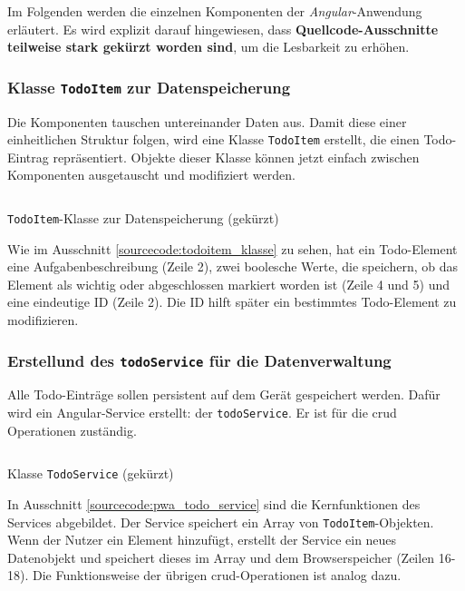 Im Folgenden werden die einzelnen Komponenten der \textit{Angular}-Anwendung erläutert. Es wird explizit darauf hingewiesen, dass \textbf{Quellcode-Ausschnitte teilweise stark gekürzt worden sind}, um die Lesbarkeit zu erhöhen.

\subsubsection{Klasse \texttt{TodoItem} zur Datenspeicherung}

Die Komponenten tauschen untereinander Daten aus. Damit diese einer einheitlichen Struktur folgen, wird eine Klasse \texttt{TodoItem} erstellt, die einen Todo-Eintrag repräsentiert. Objekte dieser Klasse können jetzt einfach zwischen Komponenten ausgetauscht und modifiziert werden.

\begin{listing}[h]
	\inputminted{TypeScript}{sourcecode/pwa_todoitem_klasse.js}
	\caption{\texttt{TodoItem}-Klasse zur Datenspeicherung (gekürzt)}
	\label{sourcecode:todoitem_klasse}
\end{listing}

Wie im Ausschnitt \ref{sourcecode:todoitem_klasse} zu sehen, hat ein Todo-Element eine Aufgabenbeschreibung (Zeile 2), zwei boolesche Werte, die speichern, ob das Element als wichtig oder abgeschlossen markiert worden ist (Zeile 4 und 5) und eine eindeutige ID (Zeile 2). Die ID hilft später ein bestimmtes Todo-Element zu modifizieren.

\subsubsection{Erstellund des \texttt{todoService} für die Datenverwaltung}
Alle Todo-Einträge sollen persistent auf dem Gerät gespeichert werden. Dafür wird ein Angular-Service erstellt: der \texttt{todoService}. Er ist für die \acf{crud} Operationen zuständig.

\begin{listing}[h]
	\inputminted{TypeScript}{sourcecode/pwa_todo_service.ts}
	\caption{Klasse \texttt{TodoService} (gekürzt)}
	\label{sourcecode:pwa_todo_service}
\end{listing}

In Ausschnitt \ref{sourcecode:pwa_todo_service} sind die Kernfunktionen des Services abgebildet. Der Service speichert ein Array von \texttt{TodoItem}-Objekten. Wenn der Nutzer ein Element hinzufügt, erstellt der Service ein neues Datenobjekt und speichert dieses im Array und dem Browserspeicher (Zeilen 16-18). Die Funktionsweise der übrigen \ac{crud}-Operationen ist analog dazu.

